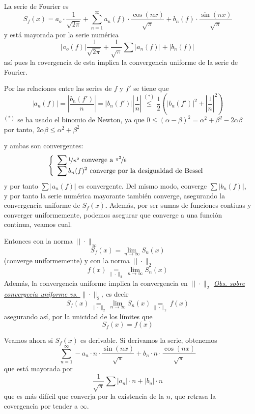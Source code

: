     \begin{dem}
        La serie de Fourier es
        $$S_f(x)=a_o \cdot \dfrac{1}{\sqrt{2\pi}}+ \sum_{n=1}^{\infty} a_n(f) \cdot \dfrac{\cos(nx)}{\sqrt{\pi}} + b_n(f) \cdot \dfrac{\sin(nx)}{\sqrt{\pi}}$$
        y está mayorada por la serie numérica
        $$|a_o(f)| \dfrac{1}{\sqrt{2\pi}} + \dfrac{1}{\sqrt{\pi}} \sum |a_n(f)| + |b_n(f)|$$
        así pues la covergencia de esta implica la convergencia uniforme de la serie de Fourier.

        Por las relaciones entre las series de $f$ y $f'$ se tiene que
        $$|a_n(f)|=\left|\dfrac{b_n(f')}{n} \right|=|b_n(f')|\left|\dfrac{1}{n}\right| \overset{(*)}{\leq} \dfrac{1}{2} \left( |b_n(f')|^2 +\left|\dfrac{1}{n}\right|^2\right)$$
        $^{(*)}$ se ha usado el binomio de Newton, ya que $0 \leq (\alpha-\beta)^2=\alpha^2+\beta^2-2\alpha\beta$ por tanto, $2\alpha\beta\leq\alpha^2+\beta^2$
        
        y ambas son convergentes:
        $$\left\{\begin{array}{l}
             \displaystyle \sum \nicefrac{1}{n^2} \text{ converge a } \nicefrac{\pi^2}{6}\\
             \displaystyle \sum b_n(f)^2 \text{ converge por la desigualdad de Bessel}
        \end{array} \right.$$
        y por tanto  $\sum |a_n(f)|$ es convergente. Del mismo modo, converge $\sum |b_n(f)|$, y por tanto la serie numérica mayorante también converge, asegurando la convergencia uniforme de $S_f(x)$. Además, por ser sumas de funciones contiuas y converger uniformemente, podemos asegurar que converge a una función continua, veamos cual.

        Entonces con la norma $\|\cdot \|_{\infty}$
        $$S_f(x)=\lim_{n \to \infty} S_n(x)$$
        (converge uniformemente) y con la norma $\|\cdot \|_2$
        $$f(x)\underset{\|\cdot\|_2}{=} \lim_{n \to \infty} S_n(x)$$
        Además, la convergencia uniforme implica la convergencia en $\|\cdot \|_2$ \hyperref[obsconv]{\textit{Obs. sobre convergecia uniforme vs. $\|\cdot\|_2$}}, es decir
        $$S_f(x)\underset{\|\cdot\|_2}{=}\lim_{n \to \infty} S_n(x)\underset{\|\cdot\|_2}{=}f(x)$$
        asegurando así, por la unicidad de los límites que
        $$S_f(x)=f(x)$$

        Veamos ahora si $S_f(x)$ es derivable. Si derivamos la serie, obtenemos
        $$\sum_{n=1}^{\infty} - a_n \cdot n \cdot \dfrac{\sin(nx)}{\sqrt{\pi}} + b_n \cdot n  \cdot \dfrac{\cos(nx)}{\sqrt{\pi}}$$
        que está mayorada por
        $$\dfrac{1}{\sqrt{\pi}} \sum |a_n| \cdot n + |b_n|  \cdot n $$
        que es más difícil que converja por la existencia de la $n$, que retrasa la covergencia por tender a $\infty$. 


\end{dem}
